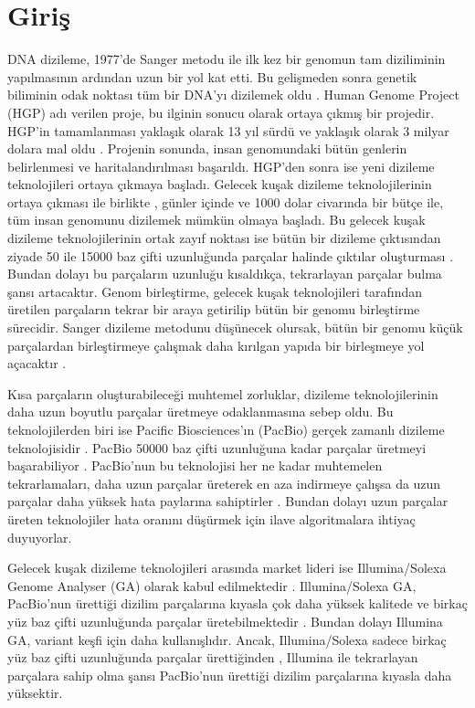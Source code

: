 \section{Giriş}

DNA dizileme, 1977'de Sanger metodu \cite{sanger} ile ilk kez bir genomun tam diziliminin yapılmasının ardından uzun bir yol kat etti. Bu gelişmeden sonra genetik biliminin odak noktası tüm bir DNA'yı dizilemek oldu \cite{kircher}. Human Genome Project (HGP) adı verilen proje, bu ilginin sonucu olarak ortaya çıkmış bir projedir. HGP'in tamamlanması yaklaşık olarak 13 yıl sürdü ve yaklaşık olarak 3 milyar dolara mal oldu \cite{genomep}. Projenin sonunda, insan genomundaki bütün genlerin belirlenmesi ve haritalandırılması başarıldı. HGP'den sonra ise yeni dizileme teknolojileri ortaya çıkmaya başladı. Gelecek kuşak dizileme teknolojilerinin ortaya çıkması ile birlikte \cite{bentley, clarke, harris, margulies, shendure, korlach},  günler içinde ve 1000 dolar civarında bir bütçe ile, tüm insan genomunu dizilemek mümkün olmaya başladı\cite{markoff}. Bu gelecek kuşak dizileme teknolojilerinin ortak zayıf noktası ise bütün bir dizileme çıktısından ziyade 50 ile 15000 baz çifti uzunluğunda parçalar halinde çıktılar oluşturması \cite{mardis}. Bundan dolayı bu parçaların uzunluğu kısaldıkça, tekrarlayan parçalar bulma şansı artacaktır. Genom birleştirme, gelecek kuşak teknolojileri tarafından üretilen parçaların tekrar bir araya getirilip bütün bir genomu birleştirme sürecidir. Sanger dizileme metodunu düşünecek olursak, bütün bir genomu küçük parçalardan birleştirmeye çalışmak daha kırılgan yapıda bir birleşmeye yol açacaktır \cite{schatz}.

Kısa parçaların oluşturabileceği muhtemel zorluklar, dizileme teknolojilerinin daha uzun boyutlu parçalar üretmeye odaklanmasına sebep oldu. Bu teknolojilerden biri ise Pacific Biosciences'ın (PacBio) gerçek zamanlı dizileme teknolojisidir \cite{eid}. PacBio 50000 baz çifti uzunluğuna kadar parçalar üretmeyi başarabiliyor \cite{lee}. PacBio'nun bu teknolojisi her ne kadar muhtemelen tekrarlamaları, daha uzun parçalar üreterek en aza indirmeye çalışsa da uzun parçalar daha yüksek hata paylarına sahiptirler \cite{ono}. Bundan dolayı uzun parçalar üreten teknolojiler hata oranını düşürmek için ilave algoritmalara ihtiyaç duyuyorlar.

Gelecek kuşak dizileme teknolojileri arasında market lideri ise Illumina/Solexa Genome Analyser (GA) olarak kabul edilmektedir \cite{Metzker2010}. Illumina/Solexa GA, PacBio'nun ürettiği dizilim parçalarına kıyasla çok daha yüksek kalitede ve birkaç yüz baz çifti uzunluğunda parçalar üretebilmektedir \cite{Metzker2010}. Bundan dolayı Illumina GA, variant keşfi için daha kullanışlıdır. Ancak, Illumina/Solexa sadece birkaç yüz baz çifti uzunluğunda parçalar ürettiğinden \cite{Shendure2008}, Illumina ile tekrarlayan parçalara sahip olma şansı PacBio'nun ürettiği dizilim parçalarına kıyasla daha yüksektir.

